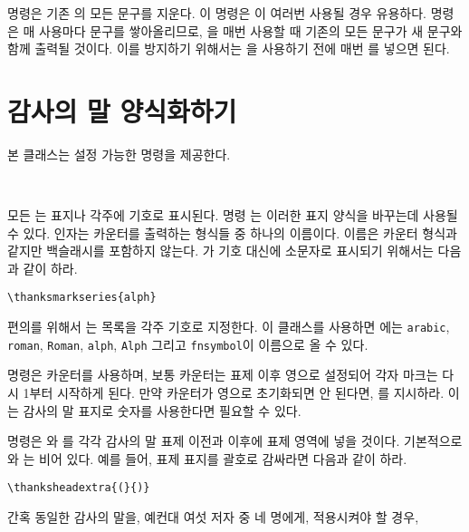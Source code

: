 \documentclass[10pt,a4paper]{oblivoir}
\begin{document}
\cmd{\emptythanks} 명령은 기존 \cmd{\thanks}의 모든 문구를 지운다.
이 명령은 \cmd{\maketitle}이 여러번 사용될 경우 유용하다.
\cmd{\thanks} 명령은 매 사용마다 문구를 쌓아올리므로, \cmd{\maketitle}을 매번
사용할 때 기존의 모든 \cmd{\thanks} 문구가 새 문구와 함께 출력될 것이다.
이를 방지하기 위해서는 \cmd{\maketitle}을 사용하기 전에 매번
\cmd{\emptythanks}를 넣으면 된다.


\section{감사의 말 양식화하기}

본 클래스는 설정 가능한 \cmd{\thanks} 명령을 제공한다.
\begin{tcolorbox}
\cmd{\thanksmarkseries}\\
\cmd{\symbolthanksmark}
\end{tcolorbox}
모든 \cmd{\thanks}는 표지나 각주에 기호로 표시된다.
명령 \cmd{\thanksmarkseries}는 이러한 표지 양식을 바꾸는데 사용될 수 있다.
 인자는 카운터를 출력하는 형식들 중 하나의 이름이다.
이름은 카운터 형식과 같지만 백슬래시를 포함하지 않는다.
\cmd{\thanks}가 기호 대신에 소문자로 표시되기 위해서는 다음과 같이 하라.
\begin{verbatim}
\thanksmarkseries{alph}
\end{verbatim}
편의를 위해서 \cmd{\symbolthanksmark}는 목록을 각주 기호로 지정한다.
이 클래스를 사용하면 에는 \texttt{arabic}, \texttt{roman},
\texttt{Roman}, \texttt{alph}, \texttt{Alph} 그리고 \texttt{fnsymbol}이
이름으로 올 수 있다.

\begin{tcolorbox}
\cmd{\continuousmarks}
\end{tcolorbox}
\cmd{\thanks} 명령은  카운터를 사용하며, 보통 카운터는 표제 이후
영으로 설정되어 각자 마크는 다시 1부터 시작하게 된다.
만약 카운터가 영으로 초기화되면 안 된다면, \cmd{\continuousmarks}를 지시하라.
이는 감사의 말 표지로 숫자를 사용한다면 필요할 수 있다.

\begin{tcolorbox}
\cmd{\thanksheadextra}
\end{tcolorbox}
\cmd{\thanksheadextra} 명령은 와 를 각각 감사의 말 표제
이전과 이후에 표제 영역에 넣을 것이다.
기본적으로 와 는 비어 있다.
예를 들어, 표제 표지를 괄호로 감싸라면 다음과 같이 하라.
\begin{verbatim}
\thanksheadextra{(}{)}
\end{verbatim}

\begin{tcolorbox}
\cmd{\thanksmark}
\end{tcolorbox}
간혹 동일한 감사의 말을, 예컨대 여섯 저자 중 네 명에게, 적용시켜야 할 경우, 
\end{document}
